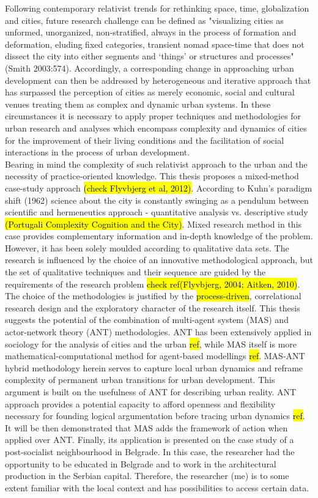\documentclass[11pt]{report}
\begin{document}
Following contemporary relativist trends for rethinking space, time, globalization and cities, future research challenge can be defined as "visualizing cities as unformed, unorganized, non-stratified, always in the process of formation and deformation, eluding fixed categories, transient nomad space-time that does not dissect the city into either segments and ‘things’ or structures and processes" (Smith 2003:574). Accordingly, a corresponding change in approaching urban development can then be addressed by heterogeneous and iterative approach that has surpassed the perception of cities as merely economic, social and cultural venues treating them as complex and dynamic urban systems. In these circumstances it is necessary to apply proper techniques and methodologies for urban research and analyses which encompass complexity and dynamics of cities for the improvement of their living conditions and the facilitation of social interactions in the process of urban development. 
\\
Bearing in mind the complexity of such relativist approach to the urban and the necessity of practice-oriented knowledge. This thesis proposes a mixed-method case-study approach \hl{(check Flyvbjerg et al, 2012)}. According to Kuhn's paradigm shift (1962) science about the city is constantly swinging as a pendulum between scientific and hermeneutics approach - quantitative analysis vs. descriptive study \hl{(Portugali Complexity Cognition and the City)}. Mixed research method in this case provides complementary information and in-depth knowledge of the problem. However, it has been solely moulded according to qualitative data sets. The research is influenced by the choice of an innovative methodological approach,  but  the  set of qualitative techniques  and  their  sequence  are  guided by the requirements of the research problem \hl{check ref(Flyvbjerg, 2004; Aitken, 2010)}.
\\
The choice of the methodologies is justified by the \hl{process-driven}, correlational research design and the exploratory character of the research itself. This thesis suggests the potential of the combination of multi-agent system (MAS) and actor-network theory (ANT) methodologies. ANT has been extensively applied in sociology for the analysis of cities and the urban \hl{ref}, while MAS itself is more mathematical-computational method for agent-based modellings \hl{ref}. MAS-ANT hybrid methodology  herein serves to capture local urban dynamics and reframe complexity of permanent urban transitions for urban development. This argument is built on the usefulness of ANT for describing urban reality. ANT approach provides a potential capacity to afford openness and flexibility necessary for founding logical argumentation before tracing urban dynamics \hl{ref}. It will be then demonstrated that MAS adds the framework of action when applied over ANT. Finally, its application is presented on the case study of a post-socialist neighbourhood in Belgrade. In this case, the researcher had the opportunity to be educated in Belgrade and to work in the architectural production in the Serbian capital. Therefore, the  researcher (me) is  to  some  extent  familiar  with  the  local  context  and has possibilities to access certain data.
\end{document}
